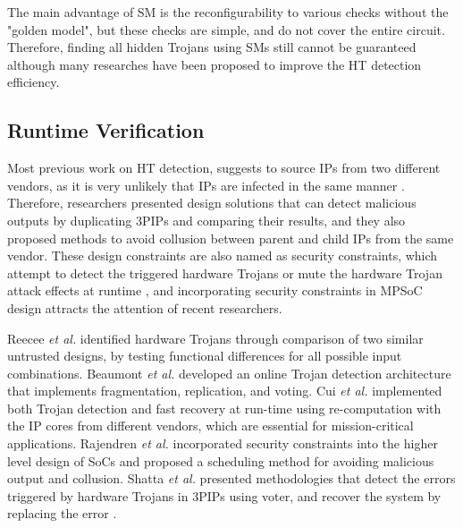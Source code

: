 \documentclass[10pt,journal]{IEEEtran}
\begin{document}
The main advantage of SM is the reconfigurability to various checks without the "golden model", but these checks are simple, and do not cover the entire circuit. Therefore, finding all hidden Trojans using SMs still cannot be guaranteed although many researches have been proposed to improve the HT detection efficiency.




\subsection{Runtime Verification}
Most previous work on HT detection, suggests to source IPs from two different vendors, as it is very unlikely that IPs are infected in the same manner \cite{article:NV}. Therefore, researchers presented design solutions that can detect malicious outputs by duplicating 3PIPs and comparing their results, and they also proposed methods to avoid collusion between parent and child IPs from the same vendor. These design constraints are also named as security constraints, which attempt to detect the triggered hardware Trojans or mute the hardware Trojan attack effects at runtime \cite{article:JR3} \cite{article:SS}, and incorporating security constraints in MPSoC design attracts the attention of recent researchers.

Reecee \textit{et al.} \cite{article:TR} identified hardware Trojans through comparison of two similar untrusted designs, by testing functional differences for all possible input combinations. Beaumont \textit{et al.} \cite{conference:MB} developed an online Trojan detection architecture that implements fragmentation, replication, and voting. Cui \textit{et al.} \cite{conference:XC} implemented both Trojan detection and fast recovery at run-time using re-computation with the IP cores from different vendors, which are essential for mission-critical applications. Rajendren \textit{et al.} \cite{conference:JR2} incorporated security constraints into the higher level design of SoCs and proposed a scheduling method for avoiding malicious output and collusion. Shatta \textit{et al.} \cite{conference:MS} presented methodologies that detect the errors triggered by hardware Trojans in 3PIPs using voter, and recover the system by replacing the error \cite{conference:MS}.
\end{document}
